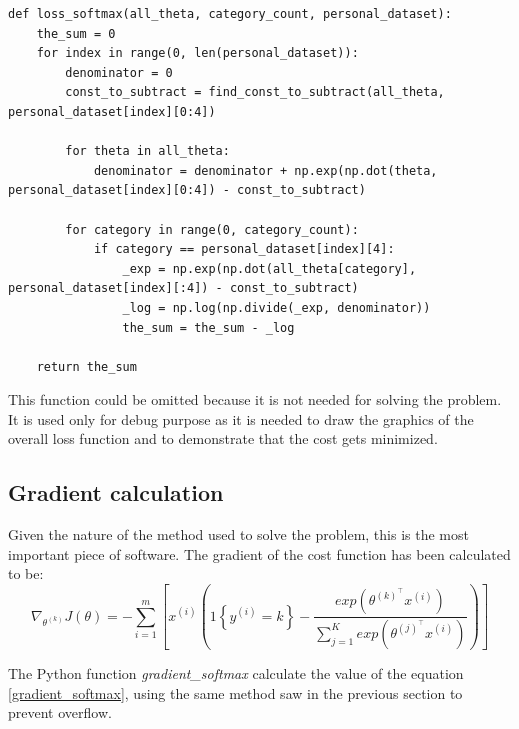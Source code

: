 \documentclass[a4paper,11pt,oneside]{book}
\begin{document}
\begin{lstlisting}
def loss_softmax(all_theta, category_count, personal_dataset):
    the_sum = 0
    for index in range(0, len(personal_dataset)):
        denominator = 0
        const_to_subtract = find_const_to_subtract(all_theta, personal_dataset[index][0:4])
		
        for theta in all_theta:
            denominator = denominator + np.exp(np.dot(theta, personal_dataset[index][0:4]) - const_to_subtract)
		
        for category in range(0, category_count):
            if category == personal_dataset[index][4]:
                _exp = np.exp(np.dot(all_theta[category], personal_dataset[index][:4]) - const_to_subtract)
                _log = np.log(np.divide(_exp, denominator))
                the_sum = the_sum - _log
	
	return the_sum
\end{lstlisting}

This function could be omitted because it is not needed for solving the problem. It is used only for debug purpose as it is needed to draw the graphics of the overall loss function and to demonstrate that the cost gets minimized.

\subsection{Gradient calculation}
Given the nature of the method used to solve the problem, this is the most important piece of software. The gradient of the cost function has been calculated to be:
\begin{equation}
	\nabla_{\theta^{(k)}}J(\theta) = - \sum_{i=1}^{m} \left[ x^{(i)} \left( 1 \left\{ y^{(i)}=k \right\} -     \dfrac{exp\left(\theta^{(k)^{\top}}x^{(i)} \right)}{ \sum_{j=1}^{K} exp\left(\theta^{(j)^{\top}}x^{(i)} \right)}      \right) \right]
	\label{gradient_softmax}
\end{equation}

The Python function \textit{gradient\_softmax} calculate the value of the equation \ref{gradient_softmax}, using the same method saw in the previous section to prevent overflow.
\end{document}
